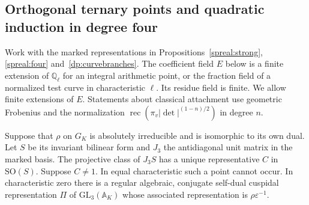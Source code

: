 \subsection{Orthogonal ternary points and quadratic induction in degree four}
\label{hr:section}

Work with the marked representations in Propositions~\ref{spreal:strong},
\ref{spreal:four} and~\ref{dp:curvebranches}. The coefficient field \(E\)
below is a finite extension of \(\mathbb Q_\ell\) for an integral
arithmetic point, or the fraction field of a normalized test curve in
characteristic \(\ell\). Its residue field is finite. We allow finite
extensions of \(E\). Statements about classical attachment use
geometric Frobenius and the normalization
\(\operatorname{rec}(\pi_v|\det|^{(1-n)/2})\) in degree \(n\).

\begin{proposition}\label{hr:orth}
Suppose that \(\rho\) on \(G_K\) is absolutely irreducible and is
isomorphic to its own dual. Let \(S\) be its invariant bilinear form
and \(J_3\) the antidiagonal unit matrix in the marked basis. The
projective class of \(J_3S\) has a unique representative \(C\) in
\(\mathrm{SO}(S)\). Suppose \(C\ne1\). In equal characteristic
such a point cannot occur. In characteristic zero there is a
regular algebraic, conjugate self-dual cuspidal representation
\(\Pi\) of \(\mathrm{GL}_3(\mathbb A_K)\) whose associated
representation is \(\rho\varepsilon^{-1}\).
\end{proposition}
